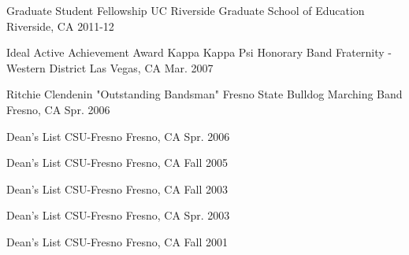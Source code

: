 

\begin{cvhonors}

  \cvhonor
    {Graduate Student Fellowship} %
    {UC Riverside Graduate School of Education} %
    {Riverside, CA} %
    {2011-12} %


  \cvhonor
    {Ideal Active Achievement Award} %
    {Kappa Kappa Psi Honorary Band Fraternity - Western District} %
    {Las Vegas, CA} %
    {Mar. 2007} %


  \cvhonor
    {Ritchie Clendenin "Outstanding Bandsman"} %
    {Fresno State Bulldog Marching Band} %
    {Fresno, CA} %
    {Spr. 2006} %


  \cvhonor
    {Dean's List} %
    {CSU-Fresno} %
    {Fresno, CA} %
    {Spr. 2006} %


  \cvhonor
    {Dean's List} %
    {CSU-Fresno} %
    {Fresno, CA} %
    {Fall 2005} %


  \cvhonor
    {Dean's List} %
    {CSU-Fresno} %
    {Fresno, CA} %
    {Fall 2003} %


  \cvhonor
    {Dean's List} %
    {CSU-Fresno} %
    {Fresno, CA} %
    {Spr. 2003} %


  \cvhonor
    {Dean's List} %
    {CSU-Fresno} %
    {Fresno, CA} %
    {Fall 2001} %



\end{cvhonors}
